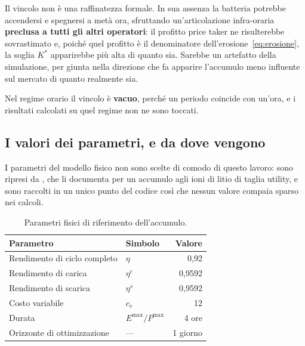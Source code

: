 Il vincolo non \`e una raffinatezza formale. In sua assenza la batteria potrebbe accendersi e
spegnersi a met\`a ora, sfruttando un'articolazione infra-oraria \textbf{preclusa a tutti gli
altri operatori}: il profitto price taker ne risulterebbe sovrastimato e, poich\'e quel profitto
\`e il denominatore dell'erosione~\eqref{eq:erosione}, la soglia $K^*$ apparirebbe pi\`u alta di
quanto sia. Sarebbe un artefatto della simulazione, per giunta nella direzione che fa apparire
l'accumulo meno influente sul mercato di quanto realmente sia.

Nel regime orario il vincolo \`e \textbf{vacuo}, perch\'e un periodo coincide con un'ora, e i
risultati calcolati su quel regime non ne sono toccati.


\subsection{I valori dei parametri, e da dove vengono}
\label{sec:valori-fisici}

I parametri del modello fisico non sono scelte di comodo di questo lavoro: sono ripresi da
\textcite{alonsoperez2026storage}, che li documenta per un accumulo agli ioni di litio di
taglia utility, e sono raccolti in un unico punto del codice cos\`i che nessun valore compaia
sparso nei calcoli.

\begin{table}[H]
\centering
\caption{Parametri fisici di riferimento dell'accumulo.}
\label{tab:parametri-fisici}
\begin{tabular}{@{}llr@{}}
\toprule
\textbf{Parametro} & \textbf{Simbolo} & \textbf{Valore} \\
\midrule
Rendimento di ciclo completo & $\eta$              & 0,92 \\
Rendimento di carica         & $\eta^{c}$          & 0,9592 \\
Rendimento di scarica        & $\eta^{s}$          & 0,9592 \\
Costo variabile              & $c_v$               & 12 \euromwh{} \\
Durata                       & $E^{\max}/P^{\max}$ & 4 ore \\
Orizzonte di ottimizzazione  & ---                 & 1 giorno \\
\bottomrule
\end{tabular}
\end{table}

